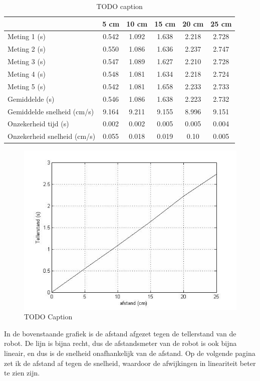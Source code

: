 \documentclass{report}
\begin{document}
\begin{table}
 \centering
\begin{tabular}{| l| c| c| c| c| c|}
\hline
   & 5 cm & 10 cm & 15 cm & 20 cm & 25 cm\\
\hline
   Meting 1 (s) & 0.542 & 1.092 & 1.638 & 2.218 & 2.728 \\
\hline
   Meting 2 (s) & 0.550 & 1.086 & 1.636 & 2.237 & 2.747 \\
\hline
   Meting 3 (s) & 0.547 & 1.089 & 1.627 & 2.210 & 2.728 \\
\hline
   Meting 4 (s) & 0.548 & 1.081 & 1.634 & 2.218 & 2.724 \\
\hline
   Meting 5 (s) & 0.542 & 1.081 & 1.658 & 2.233 & 2.733 \\
\hline
   Gemiddelde (s) & 0.546 & 1.086 & 1.638 & 2.223 & 2.732 \\
\hline
   Gemiddelde snelheid (cm/s) & 9.164 & 9.211 & 9.155 & 8.996 & 9.151 \\
\hline
   Onzekerheid tijd (s) & 0.002 & 0.002 & 0.005 & 0.005 & 0.004 \\
\hline
   Onzekerheid snelheid (cm/s) & 0.055 & 0.018 & 0.019 & 0.10 & 0.005 \\
\hline
 \end{tabular}
\caption{TODO caption}
\end{table}
\begin{figure}[H]
 \centering
\includegraphics[width=150mm] {afstand-tellerstand.jpg}
\caption{TODO Caption}
\end{figure}
In de bovenstaande grafiek is de afstand afgezet tegen de tellerstand van de robot. De lijn is bijna recht, dus de afstandsmeter van de robot is ook bijna lineair, en dus is de snelheid onafhankelijk van de afstand.  Op de volgende pagina zet ik de afstand af tegen de snelheid, waardoor de afwijkingen in lineariteit beter te zien zijn. 
\end{document}
